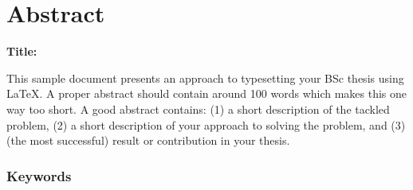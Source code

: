 \chapter*{Abstract}

\noindent\textbf{Title:} \ttitleEn
\bigskip

This sample document presents an approach to typesetting your BSc thesis using \LaTeX. A proper abstract should contain around 100 words which makes this one way too short. A good abstract contains: (1) a short description of the tackled problem, (2) a short description of your approach to solving the problem, and (3) (the most successful) result or contribution in your thesis.

\subsection*{Keywords}
\textit{\tkeywordsEn}
\clearemptydoublepage